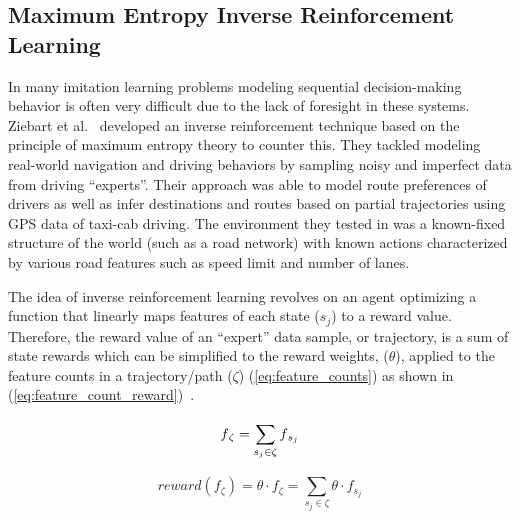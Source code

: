 \documentclass[12pt,american]{report}
\begin{document}
\subsection{Maximum Entropy Inverse Reinforcement Learning}
\label{sec:maxentirl}
In many imitation learning problems modeling sequential decision-making behavior is often very difficult due to the lack of foresight in these systems. Ziebart et al.~\cite{ziebart2008maximum} developed an inverse reinforcement technique based on the principle of maximum entropy theory to counter this.  They tackled modeling real-world navigation and driving behaviors by sampling noisy and imperfect data from driving ``experts''.  Their approach was able to model route preferences of drivers as well as infer destinations and routes based on partial trajectories using GPS data of taxi-cab driving.  The environment they tested in was a known-fixed structure of the world (such as a road network) with known actions characterized by various road features such as speed limit and number of lanes.

The idea of inverse reinforcement learning revolves on an agent optimizing a function that linearly maps features of each state (\textit{$s_j$}) to a reward value. Therefore, the reward value of an ``expert'' data sample, or trajectory, is a sum of state rewards which can be simplified to the reward weights, (\textit{$\theta$}), applied to the feature counts in a trajectory/path ($\zeta$) (\ref{eq:feature_counts}) as shown in (\ref{eq:feature_count_reward})~\cite{ziebart2008maximum}. 

\begin{equation}
            \label{eq:feature_counts}
            f\textsubscript{$\zeta$}= \sum_{s_j\in\zeta}^{}f\textsubscript{$s_j$}%
        \end{equation}

\begin{equation}
            \label{eq:feature_count_reward}
		 reward(f_{\zeta})=\theta \cdot f_{\zeta} = \sum_{s_j \in \zeta}^{} \theta \cdot f_{s_j}
        \end{equation}
\end{document}
